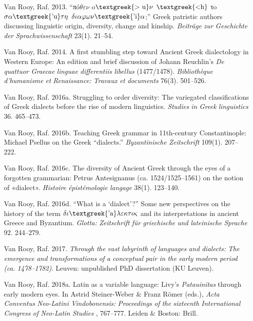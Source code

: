 \documentclass[output=paper]{langsci/langscibook}
\begin{document}
Van Rooy, Raf. 2013. “πó$\theta \varepsilon \nu $ o$\text{\textgreek{>~u}}\nu $ $\text{\textgreek{<h}}$ τo$\sigma \alpha \text{\textgreek{'u}}\tau \eta $ $\delta \iota \alpha \varphi \omega \nu \text{\textgreek{'i}}\alpha $;” Greek patristic authors discussing linguistic origin, diversity, change and kinship. \textit{Beiträge} \textit{zur} \textit{Geschichte} \textit{der} \textit{Sprachwissenschaft} 23(1). 21–54.

Van Rooy, Raf. 2014. A first stumbling step toward Ancient Greek dialectology in Western Europe: An edition and brief discussion of Johann Reuchlin’s \textit{De} \textit{quattuor} \textit{Graecae} \textit{linguae} \textit{differentiis} \textit{libellus} (1477/1478). \textit{Bibliothèque} \textit{d’humanisme} \textit{et} \textit{Renaissance:} \textit{Travaux} \textit{et} \textit{documents} 76(3). 501–526.

Van Rooy, Raf. 2016a. Struggling to order diversity: The variegated classifications of Greek dialects before the rise of modern linguistics. \textit{Studies} \textit{in} \textit{Greek} \textit{linguistics} 36. 465–473.

Van Rooy, Raf. 2016b. Teaching Greek grammar in 11th-century Constantinople: Michael Psellus on the Greek “dialects.” \textit{Byzantinische} \textit{Zeitschrift} 109(1). 207–222.

Van Rooy, Raf. 2016c. The diversity of Ancient Greek through the eyes of a forgotten grammarian: Petrus Antesignanus (ca. 1524/1525–1561) on the notion of «dialect». \textit{Histoire} \textit{épistémologie} \textit{langage} 38(1). 123–140.

Van Rooy, Raf. 2016d. “What is a ‘dialect’?” Some new perspectives on the history of the term $\delta \iota \text{\textgreek{'a}}\lambda \varepsilon \kappa \tau o\varsigma $ and its interpretations in ancient Greece and Byzantium. \textit{Glotta:} \textit{Zeitschrift} \textit{für} \textit{griechische} \textit{und} \textit{lateinische} \textit{Sprache} 92. 244–279.

Van Rooy, Raf. 2017. \textit{Through} \textit{the} \textit{vast} \textit{labyrinth} \textit{of} \textit{languages} \textit{and} \textit{dialects:} \textit{The} \textit{emergence} \textit{and} \textit{transformations} \textit{of} \textit{a} \textit{conceptual} \textit{pair} \textit{in} \textit{the} \textit{early} \textit{modern} \textit{period} \textit{(ca.} \textit{1478–1782)}. Leuven: unpublished PhD dissertation (KU Leuven).

Van Rooy, Raf. 2018a. Latin as a variable language: Livy’s \textit{Patauinitas} through early modern eyes. In Astrid Steiner-Weber \& Franz Römer (eds.), \textit{Acta} \textit{Conventus} \textit{Neo-Latini} \textit{Vindobonensis:} \textit{Proceedings} \textit{of} \textit{the} \textit{sixteenth} \textit{International} \textit{Congress} \textit{of} \textit{Neo-Latin} \textit{Studies} \textit{\citep{Vienna2015}}, 767–777. Leiden \& Boston: Brill.
\end{document}
